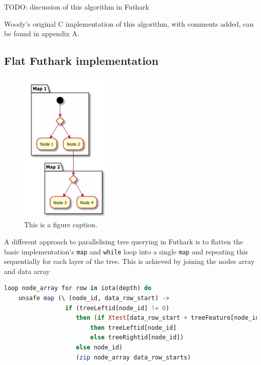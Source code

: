 \documentclass[a4paper]{article}
\begin{document}
TODO: discussion of this algorithm in Futhark

Woody's original C implementation of this algorithm, with comments added, can be found in appendix A.

\subsection{Flat Futhark implementation}

\begin{figure}
\centering
\includegraphics[width=0.4\textwidth]{tree_flat.pdf}
\caption{\label{fig:frog1}This is a figure caption.}
\end{figure}

A different approach to parallelising tree querying in Futhark is to flatten the basic implementation's \texttt{map} and \texttt{while} loop into a single \texttt{map} and repeating this sequentially for each layer of the tree. This is achieved by joining the nodes array and data array

\vspace{1ex}
\begin{lrbox}{\lstboxtwo}
\begin{minipage}{\textwidth}
\begin{lstlisting}[language=Haskell, breaklines]
loop node_array for row in iota(depth) do
    unsafe map (\ (node_id, data_row_start) ->
                 if (treeLeftid[node_id] != 0)
                    then (if Xtest[data_row_start + treeFeature[node_id]] <= treeThres_or_leaf[node_id]
                        then treeLeftid[node_id]
                        else treeRightid[node_id])
                    else node_id)
                    (zip node_array data_row_starts)
\end{lstlisting}
\end{minipage}
\end{lrbox}
\vspace{1ex}
\end{document}
